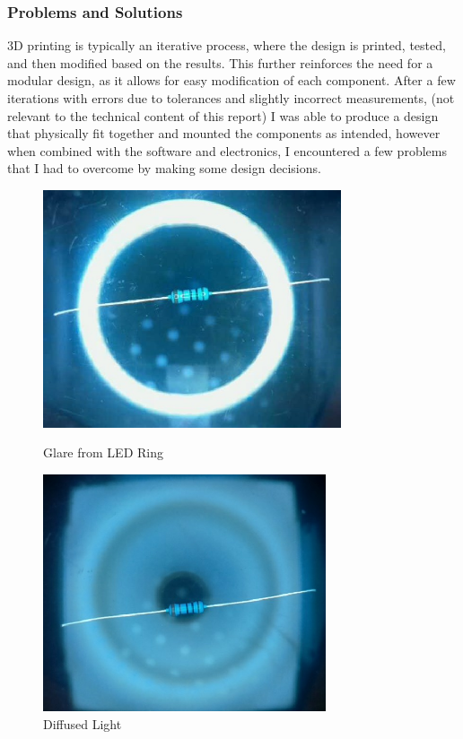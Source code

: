 \subsubsection{Problems and Solutions}
3D printing is typically an iterative process, where the design is printed, tested, and then modified based on the results.
This further reinforces the need for a modular design, as it allows for easy modification of each component.
After a few iterations with errors due to tolerances and slightly incorrect measurements, (not relevant to the technical content of this report)
I was able to produce a design that physically fit together and mounted the components as intended, however when combined with the software
and electronics, I encountered a few problems that I had to overcome by making some design decisions.

\begin{figure}
    \begin{minipage}[t]{0.49\textwidth}
        \centering
        \includegraphics[width=\textwidth,height=7cm, keepaspectratio]{imgs/design/ringlight.jpg}
        \caption{Glare from LED Ring}
        \label{fig:glare}
    \end{minipage}
    \hfill
    \begin{minipage}[t]{0.49\textwidth}
        \centering
        \includegraphics[width=\textwidth,height=7cm, keepaspectratio]{imgs/design/diffusedlight.jpg}
        \caption{Diffused Light}
        \label{fig:diffusedlight}
    \end{minipage}
\end{figure}


